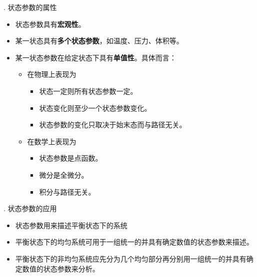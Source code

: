 . 状态参数的属性
\begin{itemize}
	\item 状态参数具有\textbf{宏观性}。
	\item 某一状态具有\textbf{多个状态参数}，如温度、压力、体积等。
	\item 某一状态参数在给定状态下具有\textbf{单值性}。具体而言：
	\begin{itemize}
		\item 在物理上表现为
		\begin{itemize}
			\item 状态一定则所有状态参数一定。
			\item 状态变化则至少一个状态参数变化。
			\item 状态参数的变化只取决于始末态而与路径无关。
		\end{itemize}
		\item 在数学上表现为
		\begin{itemize}
			\item 状态参数是点函数。
			\item 微分是全微分。
			\item 积分与路径无关。
		\end{itemize}
	\end{itemize}
\end{itemize}

. 状态参数的应用
\begin{itemize}
	\item 状态参数用来描述平衡状态下的系统
	\item 平衡状态下的均匀系统可用于一组统一的并具有确定数值的状态参数来描述。
	\item 平衡状态下的非均匀系统应先分为几个均匀部分再分别用一组统一的并具有确定数值的状态参数来分析。
\end{itemize}

